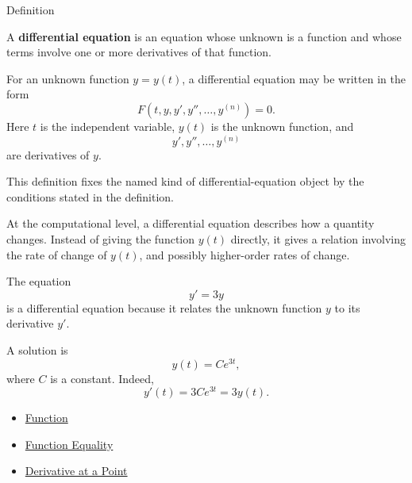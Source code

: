 
\begin{definitionbox}{Definition}
\begin{definition}
\label{def:ordinary-differential-equations-terminology-differential-equation}
A \textbf{differential equation} is an equation whose unknown is a function and whose terms involve one or more derivatives of that function.

For an unknown function $y=y(t)$, a differential equation may be written in the form
\[
F(t,y,y',y'',\dots,y^{(n)})=0.
\]
Here $t$ is the independent variable, $y(t)$ is the unknown function, and
\[
y',y'',\dots,y^{(n)}
\]
are derivatives of $y$.
\end{definition}
\end{definitionbox}

\begin{remark*}
This definition fixes the named kind of differential-equation object by the
conditions stated in the definition.
\end{remark*}

\begin{remark*}[Interpretation]
At the computational level, a differential equation describes how a quantity changes. Instead of giving the function $y(t)$ directly, it gives a relation involving the rate of change of $y(t)$, and possibly higher-order rates of change.
\end{remark*}

\begin{remark*}[Examples]
The equation
\[
y'=3y
\]
is a differential equation because it relates the unknown function $y$ to its derivative $y'$.

A solution is
\[
y(t)=Ce^{3t},
\]
where $C$ is a constant. Indeed,
\[
y'(t)=3Ce^{3t}=3y(t).
\]
\end{remark*}

\begin{dependencies}
\begin{itemize}
  \item \hyperref[def:function]{Function}
  \item \hyperref[def:function-equality]{Function Equality}
  \item \hyperref[def:derivative-at-a-point]{Derivative at a Point}
\end{itemize}
\end{dependencies}

